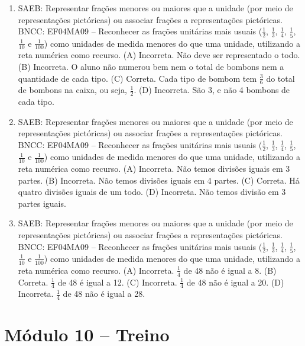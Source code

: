 \begin{enumerate}
\item
SAEB: Representar frações menores ou maiores que a unidade (por meio de representações
pictóricas) ou associar frações a representações pictóricas.
BNCC: EF04MA09 -- Reconhecer as frações unitárias mais usuais ($\frac{1}{2}$, $\frac{1}{3}$, $\frac{1}{4}$, $\frac{1}{5}$, $\frac{1}{10}$ e $\frac{1}{100}$) como
unidades de medida menores do que uma unidade, utilizando a reta numérica como recurso.
(A) Incorreta. Não deve ser representado o todo.
(B) Incorreta. O aluno não numerou bem nem o total de bombons nem a quantidade de cada tipo.
(C) Correta. Cada tipo de bombom tem $\frac{3}{6}$ do total de bombons na caixa, ou seja, $\frac{1}{2}$.
(D) Incorreta. São 3, e não 4 bombons de cada tipo.

\item
SAEB: Representar frações menores ou maiores que a unidade (por meio de representações
pictóricas) ou associar frações a representações pictóricas.
BNCC: EF04MA09 -- Reconhecer as frações unitárias mais usuais ($\frac{1}{2}$, $\frac{1}{3}$, $\frac{1}{4}$, $\frac{1}{5}$, $\frac{1}{10}$ e $\frac{1}{100}$) como
unidades de medida menores do que uma unidade, utilizando a reta numérica como recurso.
(A)  Incorreta. Não temos divisões iguais em 3 partes.
(B)  Incorreta. Não temos divisões iguais em 4 partes.
(C)  Correta. Há quatro divisões iguais de um todo.
(D)  Incorreta. Não temos divisão em 3 partes iguais.

\item
SAEB: Representar frações menores ou maiores que a unidade (por meio de representações
pictóricas) ou associar frações a representações pictóricas.
BNCC: EF04MA09 -- Reconhecer as frações unitárias mais usuais ($\frac{1}{2}$, $\frac{1}{3}$, $\frac{1}{4}$, $\frac{1}{5}$, $\frac{1}{10}$ e $\frac{1}{100}$) como
unidades de medida menores do que uma unidade, utilizando a reta numérica como recurso.
(A)  Incorreta. $\frac{1}{4}$ de 48 não é igual a 8.
(B)  Correta. $\frac{1}{4}$ de 48 é igual a 12.
(C)  Incorreta. $\frac{1}{4}$ de 48 não é igual a 20.
(D)  Incorreta. $\frac{1}{4}$ de 48 não é igual a 28.
\end{enumerate}

\section*{Módulo 10 – Treino}

